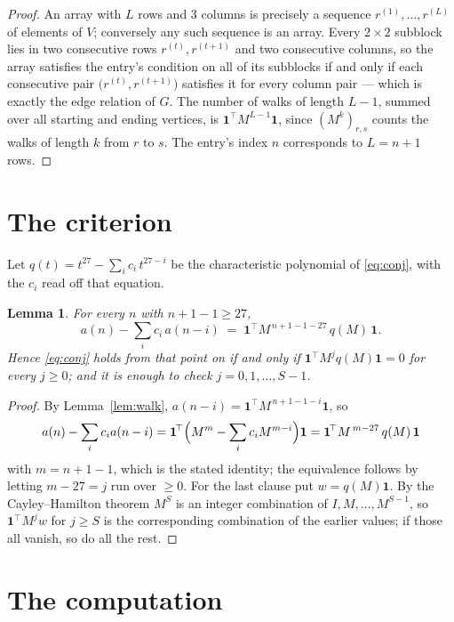 \documentclass[11pt,a4paper]{article}
\theoremstyle{plain}
\newtheorem{lemma}[theorem]{Lemma}
\theoremstyle{definition}
\begin{document}
\begin{proof}
An array with $L$ rows and $3$ columns is precisely a sequence
$r^{(1)},\dots,r^{(L)}$ of elements of $V$; conversely any such sequence is an array.
Every $2\times2$ subblock lies in two consecutive rows $r^{(t)},r^{(t+1)}$ and two
consecutive columns, so the array satisfies the entry's condition on all of its subblocks
if and only if each consecutive pair $\bigl(r^{(t)},r^{(t+1)}\bigr)$ satisfies it for
every column pair --- which is exactly the edge relation of $G$. The number of walks of
length $L-1$, summed over all starting and ending vertices, is
$\mathbf{1}^{\!\top}M^{L-1}\mathbf{1}$, since $(M^{k})_{r,s}$ counts the walks of
length $k$ from $r$ to $s$. The entry's index $n$ corresponds to $L=n+1$ rows.
\end{proof}

\section{The criterion}

Let $q(t)=t^{27}-\sum_i c_i\,t^{27-i}$ be the characteristic polynomial of
\eqref{eq:conj}, with the $c_i$ read off that equation.

\begin{lemma}\label{lem:crit}
For every $n$ with $n+1-1\ge27$,
\[
a(n)-\sum_i c_i\,a(n-i)\;=\;\mathbf{1}^{\!\top}M^{\,n+1-1-27}\,q(M)\,\mathbf{1} .
\]
Hence \eqref{eq:conj} holds from that point on if and only if
$\mathbf{1}^{\!\top}M^{j}q(M)\mathbf{1}=0$ for every $j\ge0$; and it is enough to check
$j=0,1,\dots,S-1$.
\end{lemma}

\begin{proof}
By Lemma~\ref{lem:walk}, $a(n-i)=\mathbf{1}^{\!\top}M^{\,n+1-1-i}\mathbf{1}$, so
\[
a(n)-\sum_i c_i a(n-i)
=\mathbf{1}^{\!\top}\Bigl(M^{m}-\sum_i c_i M^{m-i}\Bigr)\mathbf{1}
=\mathbf{1}^{\!\top}M^{\,m-27}\,q(M)\,\mathbf{1}
\]
with $m=n+1-1$, which is the stated identity; the equivalence follows by letting
$m-27=j$ run over $\ge0$. For the last clause put $w=q(M)\mathbf{1}$. By the
Cayley--Hamilton theorem $M^{S}$ is an integer combination of $I,M,\dots,M^{S-1}$, so
$\mathbf{1}^{\!\top}M^{j}w$ for $j\ge S$ is the corresponding combination of the earlier
values; if those all vanish, so do all the rest.
\end{proof}

\section{The computation}
\end{document}
